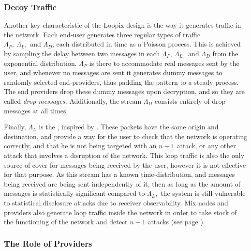 \documentclass{article}
\begin{document}
\pagebreak
\subsubsection{Decoy Traffic}


Another key characteristic of the Loopix design is the way it generates traffic in the network. Each end-user generates three regular types of traffic $\Lambda_P,\ \Lambda_L,\text{ and }\Lambda_D$, each distributed in time as a Poisson process. This is achieved by sampling the delay between two messages in each $\Lambda_P,\ \Lambda_L,\text{ and }\Lambda_D$ from the exponential distribution. $\Lambda_P$ is there to accommodate real messages sent by the user, and whenever no messages are sent it generates dummy messages to randomly selected end-providers, thus padding the pattern to a steady process. The end providers drop these dummy messages upon decryption, and so they are called \textit{drop messages.} Additionally, the stream $\Lambda_D$ consists entirely of drop messages at all times. 

Finally, $\Lambda_L$ is the , inspired by . These packets have the same origin and destination, and provide a way for the user to check that the network is operating correctly, and that he is not being targeted with an $n-1$ attack, or any other attack that involves a disruption of the network. This loop traffic is also the only source of cover for messages being received by the user, however it is not effective for that purpose. As this stream has a known time-distribution, and messages being received are being sent independently of it, then as long as the amount of messages is statistically significant compared to $\Lambda_L,$ the system is still vulnerable to statistical disclosure attacks due to receiver observability. Mix nodes and providers also generate loop traffic inside the network in order to take stock of the functioning of the network and detect $n-1$ attacks (see page \pageref{tab:attacks}).

\subsubsection{The Role of Providers}
\end{document}
